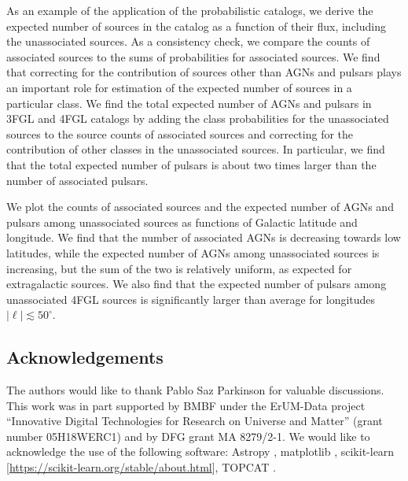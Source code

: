 As an example of the application of the probabilistic catalogs, we derive the expected number of sources in the catalog as a function of their flux, including the unassociated sources.
As a consistency check, we compare the counts of associated sources to the sums of probabilities for associated sources.
We find that correcting for the contribution of sources other than AGNs and pulsars plays an important role for estimation of the expected number of sources in a particular class.
We find the total expected number of AGNs and pulsars in 3FGL and 4FGL catalogs by adding the class probabilities for the unassociated sources to the source counts of associated sources and correcting for the contribution of other classes in the unassociated sources.
In particular, we find that the total expected number of pulsars is about two times larger than the number of associated pulsars.

We plot the counts of associated sources and the expected number of AGNs and pulsars among unassociated sources
as functions of Galactic latitude and longitude.
We find that the number of associated AGNs is decreasing towards low latitudes, while the expected number of AGNs among unassociated sources is increasing, but the sum of the two is relatively uniform, as expected for extragalactic sources.
We also find that the expected number of pulsars among unassociated 4FGL sources is significantly larger than average for longitudes 
$|\ell | \lesssim 50^\circ$.




\subsection*{Acknowledgements}

The authors would like to thank Pablo Saz Parkinson for valuable discussions.
This work was in part supported by BMBF under the ErUM-Data project ``Innovative Digital Technologies for Research on Universe and Matter'' (grant number 05H18WERC1) and by DFG grant MA 8279/2-1.
We would like to acknowledge the use of the following software:
Astropy \citep[\url{http://www.astropy.org},][]{2013A&A...558A..33A}, 
matplotlib \citep{Hunter:2007}, 
scikit-learn [\url{https://scikit-learn.org/stable/about.html}], 
TOPCAT \citep{2005ASPC..347...29T}.
